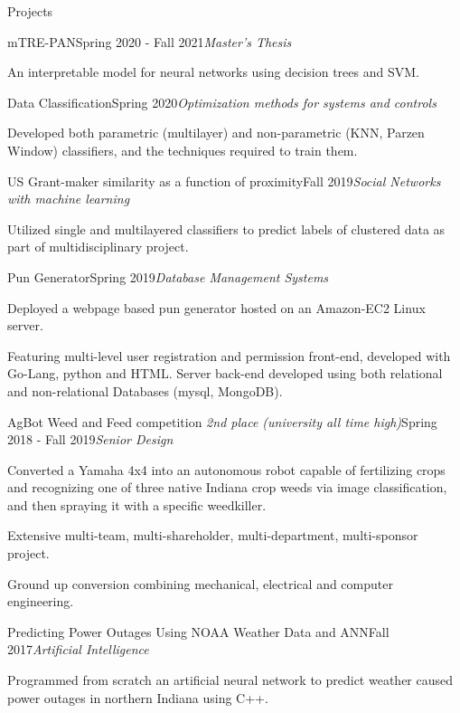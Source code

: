 \documentclass{resume}
\begin{document}
% 
% 
\begin{rSection}{Projects}
\begin{rSubsection}{mTRE-PAN}{Spring 2020 - Fall 2021}{\em Master's Thesis}{}
 \item An interpretable model for neural networks using decision trees and SVM.
\end{rSubsection}
\begin{rSubsection}{Data Classification}{Spring 2020}{\em Optimization methods for systems and controls}{}
 \item Developed both parametric (multilayer) and non-parametric (KNN, Parzen Window) classifiers, and the techniques required to train them.
\end{rSubsection}
\begin{rSubsection}{US Grant-maker similarity as a function of proximity}{Fall 2019}{\em Social Networks with machine learning}{}
 \item Utilized single and multilayered classifiers to predict labels of clustered data as part of multidisciplinary project.
\end{rSubsection}
\begin{rSubsection}{Pun Generator}{Spring 2019}{\em Database Management Systems}{}
 \item Deployed a webpage based pun generator hosted on an Amazon-EC2 Linux server.
 \item Featuring multi-level user registration and permission front-end, developed with Go-Lang, python and HTML. Server back-end developed using both relational and non-relational Databases (mysql, MongoDB).
\end{rSubsection}
\begin{rSubsection}{AgBot Weed and Feed competition \em{2nd place (university all time high)}}{Spring 2018 - Fall 2019}{\em Senior Design}{}
 \item Converted a Yamaha 4x4 into an autonomous robot capable of fertilizing crops and recognizing one of three native Indiana crop weeds via image classification, and then spraying it with a specific weedkiller.
 \item Extensive multi-team, multi-shareholder, multi-department, multi-sponsor project.
 \item Ground up conversion combining mechanical, electrical and computer engineering.
\end{rSubsection}
\begin{rSubsection}{Predicting Power Outages Using NOAA Weather Data and ANN}{Fall 2017}{\em Artificial Intelligence}{}
 \item Programmed from scratch an artificial neural network to predict weather caused power outages in northern Indiana using C++.
\end{rSubsection}
\end{rSection}
\end{document}
